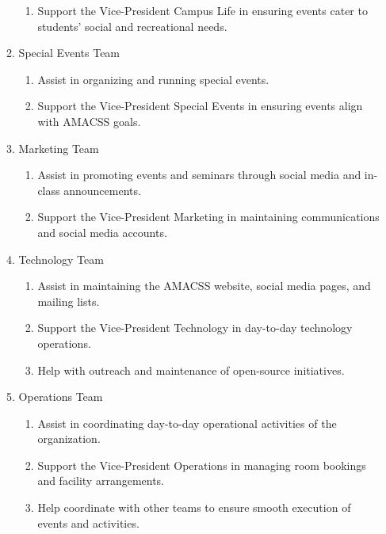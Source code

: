 \documentclass[12pt,a4paper]{article}
\begin{document}
\begin{enumerate}
\begin{enumerate}
\begin{enumerate}
\item Support the Vice-President Campus Life in ensuring events cater to students' social and recreational needs.
\end{enumerate}

\item Special Events Team

\begin{enumerate}
\item Assist in organizing and running special events.

\item Support the Vice-President Special Events in ensuring events align with AMACSS goals.
\end{enumerate}

\item Marketing Team

\begin{enumerate}
\item Assist in promoting events and seminars through social media and in-class announcements.

\item Support the Vice-President Marketing in maintaining communications and social media accounts.
\end{enumerate}

\item Technology Team

\begin{enumerate}
\item Assist in maintaining the AMACSS website, social media pages, and mailing lists.

\item Support the Vice-President Technology in day-to-day technology operations.

\item Help with outreach and maintenance of open-source initiatives.
\end{enumerate}

\item Operations Team

\begin{enumerate}
\item Assist in coordinating day-to-day operational activities of the organization.

\item Support the Vice-President Operations in managing room bookings and facility arrangements.

\item Help coordinate with other teams to ensure smooth execution of events and activities.


\end{enumerate}
\end{enumerate}
\end{enumerate}
\end{document}
